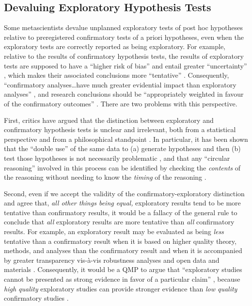 \documentclass[authordate, meta, issue]{jote-new-article}
\begin{document}
\subsection{Devaluing Exploratory Hypothesis Tests}



Some metascientists devalue unplanned exploratory tests of post hoc hypotheses relative to preregistered confirmatory tests of a priori hypotheses, even when the exploratory tests are correctly reported as being exploratory. For example, relative to the results of confirmatory hypothesis tests, the results of exploratory tests are supposed to have a “higher risk of bias” \parencites[p. 19]{Hardwicke2023} and entail greater “uncertainty” \parencites[p. 2601]{Nosek2018}, which makes their associated conclusions more “tentative” \parencites[p. 19]{Errington2021a}[p. 238]{Ioannidis2014}[p. 519]{Nelson2018}[p. 138]{Nosek2014}[p. 154]{Simmons2021}. Consequently, “confirmatory analyses…have much greater evidential impact than exploratory analyses” \parencites[p. 13]{Wagenmakers2012}, and research conclusions should be “appropriately weighted in favour of the confirmatory outcomes” \parencites[p. 36]{Chambers2022}. There are two problems with this perspective.



First, critics have argued that the distinction between exploratory and confirmatory hypothesis tests is unclear and irrelevant, both from a statistical perspective \parencites{Devezer2021}{Rubin2020}{Rubin2021b} and from a philosophical standpoint \parencites{Rubin2020}{Rubin2022}{Rubin2022a}{Szollosi2021}. In particular, it has been shown that the “double use” of the same data to (a) generate hypotheses and then (b) test those hypotheses is not necessarily problematic \parencites{Devezer2021}, and that any “circular reasoning” involved in this process can be identified by checking the \emph{contents} of the reasoning without needing to know the \emph{timing} of the reasoning \parencites{Rubin2022a}.



Second, even if we accept the validity of the confirmatory-exploratory distinction and agree that, \emph{all other things being equal,} exploratory results tend to be more tentative than confirmatory results, it would be a fallacy of the general rule to conclude that \emph{all} exploratory results are more tentative than \emph{all} confirmatory results. For example, an exploratory result may be evaluated as being \emph{less} tentative than a confirmatory result when it is based on higher quality theory, methods, and analyses than the confirmatory result and when it is accompanied by greater transparency vis-à-vis robustness analyses and open data and materials \parencites{Devezer2021}{Morey2019}{Rubin2020}{Szollosi2020}. Consequently, it would be a QMP to argue that “exploratory studies cannot be presented as strong evidence in favor of a particular claim” \parencites[p. 635]{Wagenmakers2012a}, because \emph{high quality} exploratory studies can provide stronger evidence than \emph{low quality} confirmatory studies \parencites[see also][p. 314]{Rubin2017b}.
\end{document}
